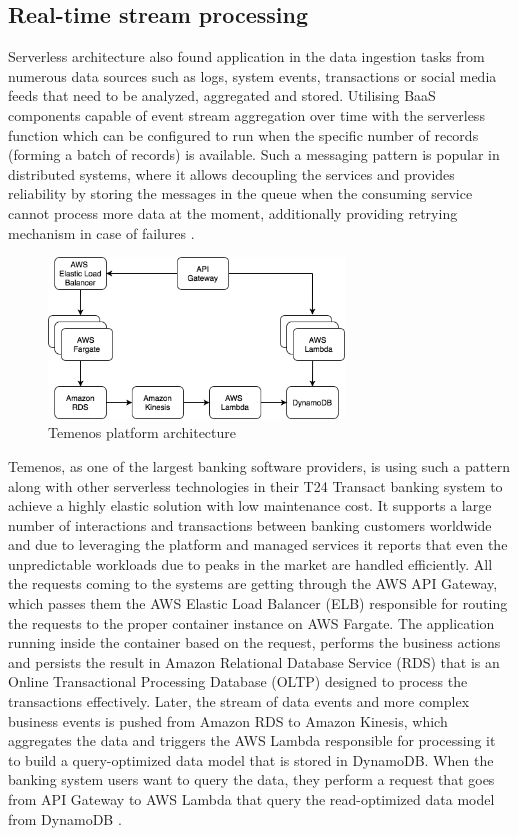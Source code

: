 \subsection{Real-time stream processing}

Serverless architecture also found application in the data ingestion tasks from numerous data sources such as logs, system events, transactions or social media feeds that need to be analyzed, aggregated and stored. Utilising BaaS components capable of event stream aggregation over time with the serverless function which can be configured to run when the specific number of records (forming a batch of records) is available. Such a messaging pattern is popular in distributed systems, where it allows decoupling the services and provides reliability by storing the messages in the queue when the consuming service cannot process more data at the moment, additionally providing retrying mechanism in case of failures \cite{ServerlessArchitectureOnAWS}.

\begin{figure}[h]
    \centering
    \includegraphics[width=0.7\textwidth]{assets/02-serverless/TemenosArchitecture.png}
    \caption{Temenos platform architecture}
    \label{fig:temenos-architecture-diagram}
\end{figure}

Temenos, as one of the largest banking software providers, is using such a pattern along with other serverless technologies in their T24 Transact banking system to achieve a highly elastic solution with low maintenance cost. It supports a large number of interactions and transactions between banking customers worldwide and due to leveraging the platform and managed services it reports that even the unpredictable workloads due to peaks in the market are handled efficiently. All the requests coming to the systems are getting through the AWS API Gateway, which passes them the AWS Elastic Load Balancer (ELB) responsible for routing the requests to the proper container instance on AWS Fargate. The application running inside the container based on the request, performs the business actions and persists the result in Amazon Relational Database Service (RDS) that is an Online Transactional Processing Database (OLTP) designed to process the transactions effectively. Later, the stream of data events and more complex business events is pushed from Amazon RDS to Amazon Kinesis, which aggregates the data and triggers the AWS Lambda responsible for processing it to build a query-optimized data model that is stored in DynamoDB. When the banking system users want to query the data, they perform a request that goes from API Gateway to AWS Lambda that query the read-optimized data model from DynamoDB \cite{ThisIsMyAchitectureTemenos}.

